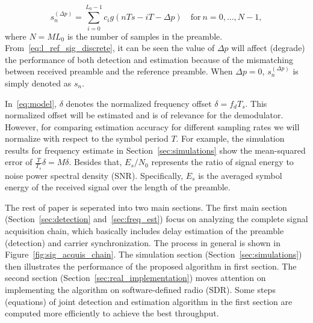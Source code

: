 \begin{equation}
  \label{eq:l_ref_sig_discrete}
  s_n^{(\Delta p)} = \sum_{i=0}^{L_0-1} c_i g(nTs-iT-\Delta p) \quad \text{for}~n=0,\ldots,N-1,
\end{equation}
where $N=ML_0$ is the number of samples in the preamble. 
From~\eqref{eq:l_ref_sig_discrete}, it can be seen the value of $\Delta p$ will affect (degrade) the performance of both detection and estimation 
because of the mismatching between received preamble and the reference preamble.
When $\Delta p=0$, $s_n^{(\Delta p)}$ is simply denoted as $s_n$.

In~\eqref{eq:model}, $\delta$ denotes the normalized frequency offset $\delta=f_dT_s$. This normalized offset
will be estimated and is of relevance for the demodulator. However, for comparing estimation accuracy for different
sampling rates we will normalize with respect to the symbol period $T$. For example, the simulation results for frequency estimate 
in Section~\ref{sec:simulations} show the mean-squared error of $\frac{T}{T_s}\delta=M\delta$.
Besides that, $E_s/N_0$ represents the ratio of signal energy to noise power spectral density (SNR).
Specifically, $E_s$ is the averaged symbol energy of the received signal over the length of the preamble.

The rest of paper is seperated into two main sections. The first main section (Section~\ref{sec:detection} and~\ref{sec:freq_est}) focus on analyzing the complete
signal acquisition chain, which basically includes delay estimation of the preamble (detection) and
carrier synchronization. The process in general is shown in Figure~\ref{fig:sig_acquis_chain}.
The simulation section (Section~\ref{sec:simulations}) then illustrates the performance of the proposed algorithm in first section.
The second section (Section~\ref{sec:real_implementation}) moves attention on implementing the algorithm 
on software-defined radio (SDR). Some steps (equations) of joint detection and estimation algorithm in the first section are computed more efficiently to achieve the best throughput.

